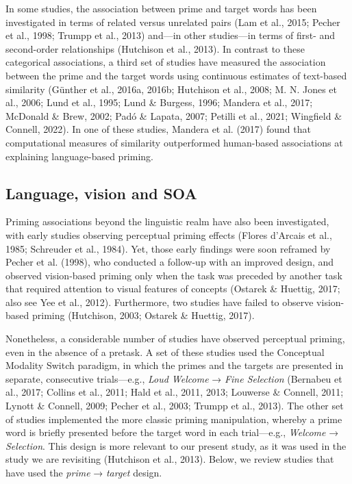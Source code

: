 \documentclass[
  12pt,
  man,floatsintext]{apa7}
\begin{document}
In some studies, the association between prime and target words has been investigated in terms of related versus unrelated pairs (Lam et al., 2015; Pecher et al., 1998; Trumpp et al., 2013) and---in other studies---in terms of first- and second-order relationships (Hutchison et al., 2013). In contrast to these categorical associations, a third set of studies have measured the association between the prime and the target words using continuous estimates of text-based similarity (Günther et al., 2016a, 2016b; Hutchison et al., 2008; M. N. Jones et al., 2006; Lund et al., 1995; Lund \& Burgess, 1996; Mandera et al., 2017; McDonald \& Brew, 2002; Padó \& Lapata, 2007; Petilli et al., 2021; Wingfield \& Connell, 2022). In one of these studies, Mandera et al. (2017) found that computational measures of similarity outperformed human-based associations at explaining language-based priming.

\hypertarget{language-vision-and-soa}{%
\subsection{Language, vision and SOA}\label{language-vision-and-soa}}

Priming associations beyond the linguistic realm have also been investigated, with early studies observing perceptual priming effects (Flores d'Arcais et al., 1985; Schreuder et al., 1984). Yet, those early findings were soon reframed by Pecher et al. (1998), who conducted a follow-up with an improved design, and observed vision-based priming only when the task was preceded by another task that required attention to visual features of concepts (Ostarek \& Huettig, 2017; also see Yee et al., 2012). Furthermore, two studies have failed to observe vision-based priming (Hutchison, 2003; Ostarek \& Huettig, 2017).

Nonetheless, a considerable number of studies have observed perceptual priming, even in the absence of a pretask. A set of these studies used the Conceptual Modality Switch paradigm, in which the primes and the targets are presented in separate, consecutive trials---e.g., \emph{Loud Welcome} → \emph{Fine Selection} (Bernabeu et al., 2017; Collins et al., 2011; Hald et al., 2011, 2013; Louwerse \& Connell, 2011; Lynott \& Connell, 2009; Pecher et al., 2003; Trumpp et al., 2013). The other set of studies implemented the more classic priming manipulation, whereby a prime word is briefly presented before the target word in each trial---e.g., \emph{Welcome} → \emph{Selection}. This design is more relevant to our present study, as it was used in the study we are revisiting (Hutchison et al., 2013). Below, we review studies that have used the \emph{prime} → \emph{target} design.
\end{document}
